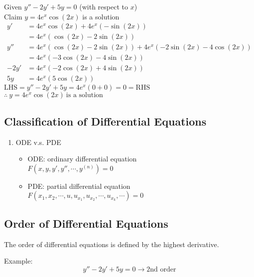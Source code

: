 \documentclass{article}
\begin{document}
Given $ y'' - 2y' + 5y = 0 $ (with respect to $x$) \\
Claim $ y = 4e^{x} \cos(2x) $ is a solution
\begin{align*}
    y' & = 4e^{x} \cos(2x) + 4e^{x} \left( - \sin(2x) \right) \\
       & = 4e^{x} \left( \cos(2x) - 2 \sin(2x) \right) \\
    y'' & = 4e^{x} \left( \cos(2x) - 2 \sin(2x) \right) + 4e^{x} \left( -2 \sin(2x) - 4 \cos(2x) \right) \\
        & = 4e^{x} \left( -3 \cos(2x) - 4 \sin(2x) \right) \\
    -2y' & = 4e^{x} \left( -2 \cos(2x) + 4 \sin(2x) \right) \\
    5y & = 4e^{x} \left( 5 \cos(2x) \right)
\end{align*}
$ \text{LHS} = y'' - 2y' + 5y = 4e^{x} \left( 0 + 0 \right) = 0 = \text{RHS} $ \\
$ \therefore\ y = 4e^{x} \cos(2x)\ \text{is a solution} $

\subsection{Classification of Differential Equations}

\begin{enumerate}
    \item ODE v.s. PDE
    \begin{itemize}
        \item ODE: ordinary differential equation \\
        $ F \left( x,y,y',y'',\cdots,y^{\left( n \right)} \right) = 0 $

        \item PDE: partial differential equation \\
        $ F \left( x_{1},x_{2},\cdots,u,u_{x_{1}},u_{x_{2}},\cdots,u_{x_{k}},\cdots \right) = 0 $
    \end{itemize}
\end{enumerate}

\subsection{Order of Differential Equations}

The order of differential equations is defined by the highest derivative.

Example:
$$ y'' - 2y' + 5y = 0 \rightarrow \text{2nd order} $$ 
\end{document}

